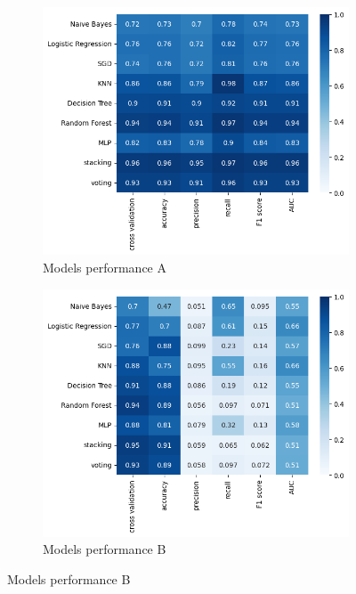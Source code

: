 \documentclass[twocolumn, 9pt]{extarticle}
\begin{document}
\begin{figure}[ht]
    \centering
    \begin{subfigure}[b]{\linewidth}
        \includegraphics[scale=0.5]{images/model_performance.png}
        \caption{Models performance A}
        \label{fig:eval_matrix_a}
    \end{subfigure}
    \begin{subfigure}[b]{\linewidth}
        \includegraphics[scale=0.5]{images/model_performance_b.png}
        \caption{Models performance B}
        \label{fig:eval_matrix_b}
    \end{subfigure}
\end{figure}
\end{document}
